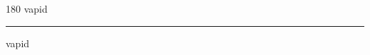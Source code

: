 
\begin{frame}
\begin{center}
\begin{turn}{180}
{\fontsize{2.5cm}{1em}\selectfont vapid}
\end{turn}
\vspace{1em}\par  
\hrule
\vspace{1em}\par  
{\fontsize{2.5cm}{1em}\selectfont vapid}
\end{center}
\end{frame}
